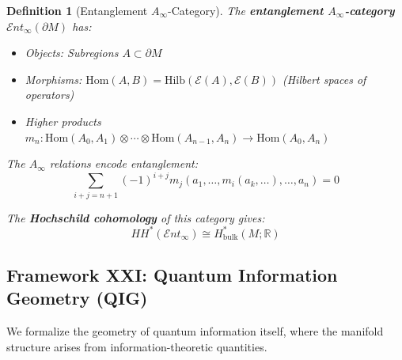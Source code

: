 \documentclass[12pt,a4paper]{article}
\newtheorem{definition}[theorem]{Definition}
\begin{document}
\begin{definition}[Entanglement $A_\infty$-Category]\label{def:ent-a-infinity}
The \textbf{entanglement $A_\infty$-category} $\mathcal{E}nt_\infty(\partial M)$ has:
\begin{itemize}
    \item Objects: Subregions $A \subset \partial M$
    \item Morphisms: $\text{Hom}(A, B) = \text{Hilb}(\mathcal{E}(A), \mathcal{E}(B))$ (Hilbert spaces of operators)
    \item Higher products $m_n: \text{Hom}(A_0, A_1) \otimes \cdots \otimes \text{Hom}(A_{n-1}, A_n) \to \text{Hom}(A_0, A_n)$
\end{itemize}

The $A_\infty$ relations encode entanglement:
\begin{equation}
\sum_{i+j=n+1} (-1)^{i+j} m_j(a_1, \ldots, m_i(a_k, \ldots), \ldots, a_n) = 0
\end{equation}

The \textbf{Hochschild cohomology} of this category gives:
\begin{equation}
HH^*(\mathcal{E}nt_\infty) \cong H^*_{\text{bulk}}(M; \mathbb{R})
\end{equation}
\end{definition}

\subsection{Framework XXI: Quantum Information Geometry (QIG)}

We formalize the geometry of quantum information itself, where the manifold structure arises from information-theoretic quantities.
\end{document}
